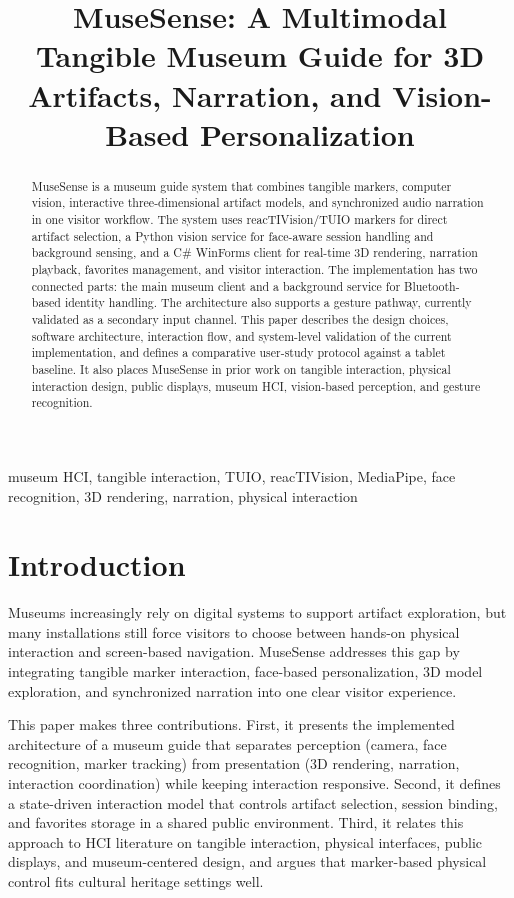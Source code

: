 \documentclass[conference]{IEEEtran}
\begin{document}
\title{MuseSense: A Multimodal Tangible Museum Guide for 3D Artifacts, Narration, and Vision-Based Personalization}

\maketitle

\begin{abstract}
MuseSense is a museum guide system that combines tangible markers, computer vision, interactive three-dimensional artifact models, and synchronized audio narration in one visitor workflow. The system uses reacTIVision/TUIO markers for direct artifact selection, a Python vision service for face-aware session handling and background sensing, and a C\# WinForms client for real-time 3D rendering, narration playback, favorites management, and visitor interaction. The implementation has two connected parts: the main museum client and a background service for Bluetooth-based identity handling. The architecture also supports a gesture pathway, currently validated as a secondary input channel. This paper describes the design choices, software architecture, interaction flow, and system-level validation of the current implementation, and defines a comparative user-study protocol against a tablet baseline. It also places MuseSense in prior work on tangible interaction, physical interaction design, public displays, museum HCI, vision-based perception, and gesture recognition.
\end{abstract}

\begin{IEEEkeywords}
museum HCI, tangible interaction, TUIO, reacTIVision, MediaPipe, face recognition, 3D rendering, narration, physical interaction
\end{IEEEkeywords}

\section{Introduction}
Museums increasingly rely on digital systems to support artifact exploration, but many installations still force visitors to choose between hands-on physical interaction and screen-based navigation. MuseSense addresses this gap by integrating tangible marker interaction, face-based personalization, 3D model exploration, and synchronized narration into one clear visitor experience.

This paper makes three contributions. First, it presents the implemented architecture of a museum guide that separates perception (camera, face recognition, marker tracking) from presentation (3D rendering, narration, interaction coordination) while keeping interaction responsive. Second, it defines a state-driven interaction model that controls artifact selection, session binding, and favorites storage in a shared public environment. Third, it relates this approach to HCI literature on tangible interaction, physical interfaces, public displays, and museum-centered design, and argues that marker-based physical control fits cultural heritage settings well.
\end{document}

